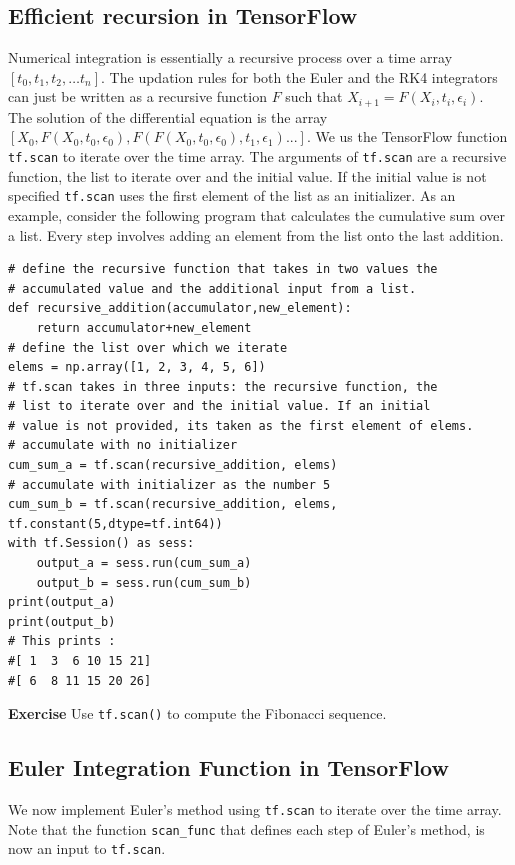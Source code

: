 \documentclass[10pt,letterpaper]{article}
\begin{document}
\subsection*{Efficient recursion in TensorFlow}
Numerical integration is essentially a recursive process over a time array $[t_{0},t_{1},t_{2},\dots t_{n}]$. The updation rules for both the Euler and the RK4 integrators can just be written as a recursive function $F$ such that $X_{i+1}=F(X_i,t_i,\epsilon_i)$. The solution of the differential equation is the array $[X_0,F(X_0,t_0,\epsilon_0),F(F(X_0,t_0,\epsilon_0),t_1,\epsilon_1)...]$. We us the TensorFlow function \texttt{tf.scan} to iterate over the time array. The arguments of \texttt{tf.scan} are a recursive function, the list to iterate over and the initial value. If the initial value is not specified \texttt{tf.scan} uses the first element of the list as an initializer. As an example, consider the following program that  calculates the cumulative sum over a list. Every step involves adding an element from the list onto the last addition. 

\begin{verbatim}
# define the recursive function that takes in two values the
# accumulated value and the additional input from a list.
def recursive_addition(accumulator,new_element):
    return accumulator+new_element
# define the list over which we iterate
elems = np.array([1, 2, 3, 4, 5, 6])
# tf.scan takes in three inputs: the recursive function, the 
# list to iterate over and the initial value. If an initial 
# value is not provided, its taken as the first element of elems.
# accumulate with no initializer
cum_sum_a = tf.scan(recursive_addition, elems) 
# accumulate with initializer as the number 5
cum_sum_b = tf.scan(recursive_addition, elems, tf.constant(5,dtype=tf.int64))
with tf.Session() as sess:
    output_a = sess.run(cum_sum_a)
    output_b = sess.run(cum_sum_b)
print(output_a)
print(output_b)
# This prints :
#[ 1  3  6 10 15 21]
#[ 6  8 11 15 20 26]
\end{verbatim}

\textbf{Exercise} Use \texttt{tf.scan()} to compute the Fibonacci sequence. 

\subsection*{Euler Integration Function in TensorFlow}
We now implement Euler's method using \texttt{tf.scan} to iterate over the time array. Note that the function \texttt{scan\_func} that defines each step of Euler's method, is now an input to \texttt{tf.scan}.
\end{document}
